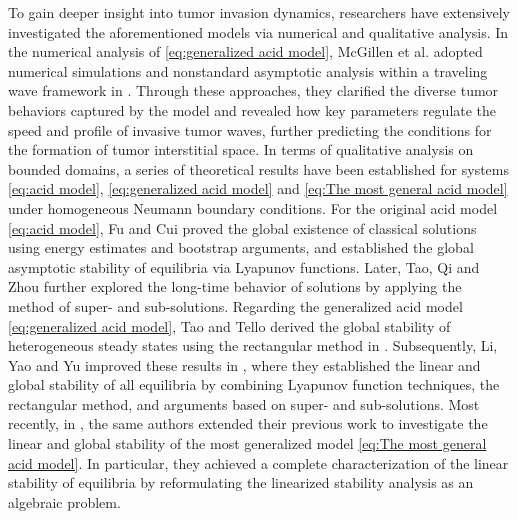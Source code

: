 \documentclass[preprint,sort&compress,final,12pt]{elsarticle}
\numberwithin{equation}{section}
\begin{document}
To gain deeper insight into tumor invasion dynamics, researchers have extensively investigated the aforementioned models via numerical and qualitative analysis. In the numerical analysis of \eqref{eq:generalized acid model}, McGillen et al. adopted numerical simulations and nonstandard asymptotic analysis within a traveling wave framework in \cite{J.B. McGillen JMB}. Through these approaches, they clarified the diverse tumor behaviors captured by the model and revealed how key parameters regulate the speed and profile of invasive tumor waves, further predicting the conditions for the formation of tumor interstitial space. In terms of qualitative analysis on bounded domains, a series of theoretical results have been established  for systems \eqref{eq:acid model}, \eqref{eq:generalized acid model} and \eqref{eq:The most general acid model} under homogeneous Neumann boundary conditions. For the original acid model \eqref{eq:acid model}, Fu and Cui \cite{2009 Global existence and stability} proved the global existence of classical solutions using energy estimates and bootstrap arguments, and established the global asymptotic stability of equilibria via Lyapunov functions. Later, Tao, Qi and Zhou \cite{tqz21} further explored the long-time behavior of solutions by applying   the method of super- and sub-solutions. Regarding the generalized acid model \eqref{eq:generalized acid model}, Tao and Tello derived the global stability of heterogeneous steady states using the rectangular method in \cite{Tao}. Subsequently, Li, Yao and Yu improved these results in \cite{2023 Li Fang JDE}, where they established the linear and global stability of all equilibria by combining Lyapunov function techniques, the rectangular method, and arguments based on super- and sub-solutions. Most recently, in \cite{2024 Lifang ZAMP}, the same authors extended their previous work to investigate the linear and global stability of the most generalized model \eqref{eq:The most general acid model}. In particular, they achieved a complete characterization of the linear stability of equilibria by reformulating the linearized stability analysis as an algebraic problem.
\end{document}
